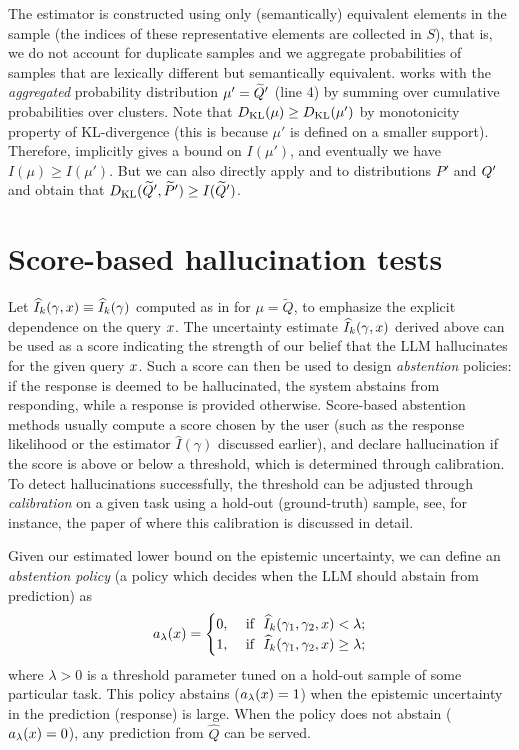 \documentclass[a4paper]{article}
\theoremstyle{plain}
\theoremstyle{definition}
\theoremstyle{plain}
\begin{document}
%
The estimator is constructed using only (semantically) equivalent elements in the sample (the indices of these representative elements are collected in $S$), that is, we do not account for duplicate samples and we aggregate probabilities of samples that are lexically different but semantically equivalent.  works with the \emph{aggregated} probability distribution $\mu'=\widetilde{Q}'$
(line 4) by summing over cumulative probabilities over clusters. Note that
$D_{\mathrm{KL}}(\mu) \geq D_{\mathrm{KL}}(\mu')$ by monotonicity property of KL-divergence
\citep[Theorem 2.16]{polyanskiy2024information} (this is because $\mu'$ is
defined on a smaller support). Therefore,  implicitly
gives a bound on $I(\mu')$, and eventually we have $I(\mu) \geq I(\mu')$. But we can also directly apply  and  to distributions $P'$ and $Q'$ and obtain that $D_{\mathrm{KL}}(\widetilde{Q}', \widetilde P') \geq I(\widetilde{Q}')$. 


\section{Score-based hallucination tests}
\label{sec:hallucination-tests}
%
Let $\widehat I_k(\gamma, x) \equiv \widehat I_k(\gamma)$ computed as in  for $\mu = \widetilde Q$,
to emphasize the explicit dependence on the query $x$.
The uncertainty estimate $\widehat I_k(\gamma,x)$ derived above can be used as a score indicating the strength of our belief that the LLM hallucinates for the given query $x$.
Such a score can then be used to design \emph{abstention} policies: if the response is deemed to be hallucinated, the system abstains from responding, while a response is provided otherwise. 
Score-based abstention methods usually compute a
score chosen by the user (such as the response likelihood or the estimator $\widehat I(\gamma)$ discussed earlier),
and declare hallucination if the score is above or below a
threshold, which is determined through calibration.
To detect hallucinations successfully, the threshold can be adjusted through \emph{calibration} on a given task using a hold-out (ground-truth) sample, see, for instance, the paper of \citet{conformal-abstention-2024} where this calibration is discussed in detail.
%

%
Given our estimated lower bound on the epistemic uncertainty, we can define an \emph{abstention policy} (a policy which decides when the LLM should abstain from prediction) as
\[
a_{\lambda}(x) = 
\begin{cases}
0, & \text{ if }\  \widehat I_k(\gamma_1, \gamma_2, x) < \lambda; \\ 
1, & \text{ if }\  \widehat I_k(\gamma_1, \gamma_2, x) \ge \lambda;
\end{cases}
\]
where $\lambda > 0$ is a threshold parameter tuned on a hold-out sample of some particular task.
This policy abstains ($a_{\lambda}(x) = 1$) when the epistemic uncertainty in the prediction (response) is large. 
When the policy does not abstain ($a_{\lambda}(x) = 0$), any prediction from $\widehat Q$ can be served. 
\end{document}
